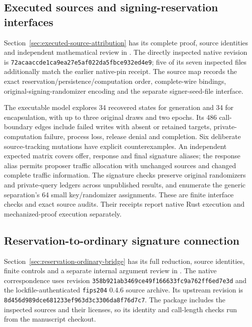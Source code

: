 \subsection{Executed sources and signing-reservation interfaces}
\label{app:source-attribution}

Section~\ref{sec:executed-source-attribution} has its complete proof,
source identities and independent mathematical review in
. The directly inspected native
revision is \texttt{72acaaccde1ca9ea27e5af022da5fbce932ed4e9}; five of its
seven inspected files additionally match the earlier native-pin receipt.
The source map records the exact reservation/persistence/computation order,
complete-wire bindings, original-signing-randomizer encoding and the
separate signer-seed-file interface.

The executable model explores 34 recovered states for generation and
34 for encapsulation, with up to three original draws and two epochs.
Its 486 call-boundary edges include failed writes with absent or retained
targets, private-computation failure, process loss, release denial and
completion. Six deliberate source-tracking mutations have explicit
counterexamples. An independent expected matrix covers offer, response
and final signature aliases; the response alias permits proposer traffic
allocation with unchanged sources and changed complete traffic information.
The signature checks preserve original randomizers and private-query
ledgers across unpublished results, and enumerate the generic separation's
64 small key/randomizer assignments. These are finite interface checks
and exact source audits. Their receipts report native Rust execution and
mechanized-proof execution separately.

\subsection{Reservation-to-ordinary signature connection}
\label{app:signature-bridge}

Section~\ref{sec:reservation-ordinary-bridge} has its full reduction,
source identities, finite controls and a separate internal argument review
in . The native correspondence uses
revision \texttt{358b921ab3469ce49f166633fc9a762ff6ed7e3d} and the
lockfile-authenticated \texttt{fips204} 0.4.6 source archive. Its upstream
revision is \texttt{8d456d989dce681233ef963d3c3306da8f76d7c7}.
The package includes the inspected sources and their licenses, so
its identity and call-length checks run from the manuscript checkout.

